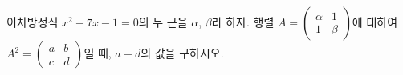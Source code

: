 이차방정식 $x^2-7x-1=0$의 두 근을 $\alpha$, $\beta$라 하자. 행렬 $A=\begin{pmatrix} \alpha & 1 \\ 1 & \beta \end{pmatrix}$에 대하여 $A^2=\begin{pmatrix} a & b \\ c & d \end{pmatrix}$일 때, $a+d$의 값을 구하시오.
